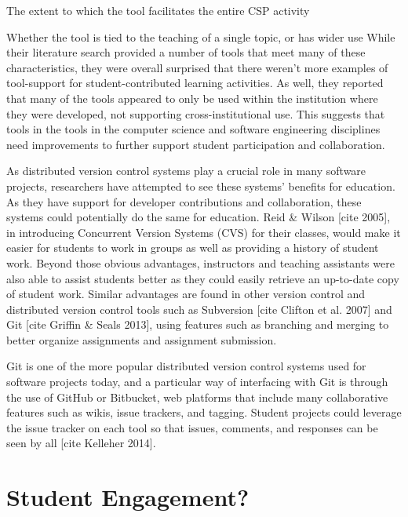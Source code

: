 The extent to which the tool facilitates the entire CSP activity

Whether the tool is tied to the teaching of a single topic, or has wider use
While their literature search provided a number of tools that meet many of these characteristics, they were overall surprised that there weren’t more examples of tool-support for student-contributed learning activities. As well, they reported that many of the tools appeared to only be used within the institution where they were developed, not supporting cross-institutional use. This suggests that tools in the tools in the computer science and software engineering disciplines need improvements to further support student participation and collaboration.

As distributed version control systems play a crucial role in many software projects, researchers have attempted to see these systems’ benefits for education. As they have support for developer contributions and collaboration, these systems could potentially do the same for education. Reid \& Wilson [cite 2005], in introducing Concurrent Version Systems (CVS) for their classes, would make it easier for students to work in groups as well as providing a history of student work. Beyond those obvious advantages, instructors and teaching assistants were also able to assist students better as they could easily retrieve an up-to-date copy of student work. Similar advantages are found in other version control and distributed version control tools such as Subversion [cite Clifton et al. 2007] and Git [cite Griffin \& Seals 2013], using features such as branching and merging to better organize assignments and assignment submission.

Git is one of the more popular distributed version control systems used for software projects today, and a particular way of interfacing with Git is through the use of GitHub or Bitbucket, web platforms that include many collaborative features such as wikis, issue trackers, and tagging. Student projects could leverage the issue tracker on each tool so that issues, comments, and responses can be seen by all [cite Kelleher 2014]. %

\section{Student Engagement?}

